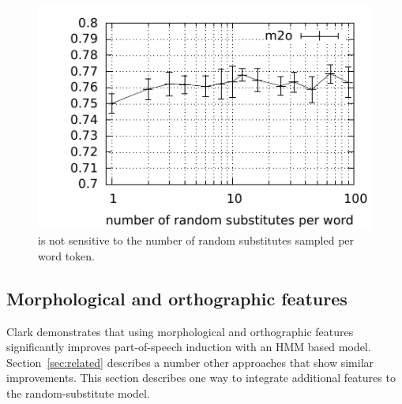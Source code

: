 \begin{figure}[ht] \centering
\includegraphics[width=\linewidth]{plot-s.pdf}
\caption{\mto is not sensitive to the number of random substitutes
  sampled per word token.}
\label{plot-s}
\end{figure}

\subsection{Morphological and orthographic features}\label{sec:feat}

Clark  demonstrates that
using morphological and orthographic features significantly improves
part-of-speech induction with an HMM based model.
Section~\ref{sec:related} describes a number other approaches that
show similar improvements.  This section describes one way to
integrate additional features to the random-substitute model.




